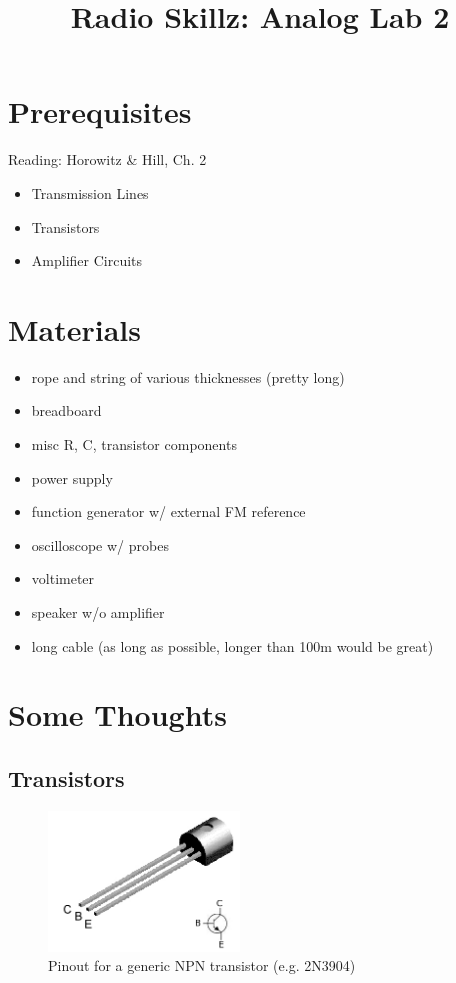 \documentclass[11pt]{article}
\begin{document}
\title{Radio Skillz: Analog Lab 2}

\maketitle

\section*{Prerequisites}

Reading: Horowitz \& Hill, Ch. 2

\begin{itemize}
\item Transmission Lines
\item Transistors
\item Amplifier Circuits
\end{itemize}

\section*{Materials}

\begin{itemize}
\item rope and string of various thicknesses (pretty long)
\item breadboard
\item misc R, C, transistor components
\item power supply
\item function generator w/ external FM reference
\item oscilloscope w/ probes
\item voltimeter
\item speaker w/o amplifier
\item long cable (as long as possible, longer than 100m would be great)
\end{itemize}

\section*{Some Thoughts}

\subsection*{Transistors}

\begin{figure}\centering
\includegraphics[width=2in]{analog_lab_2_plots/npn_transistor_pins.png}
\caption{Pinout for a generic NPN transistor (e.g. 2N3904)}
\label{fig:npn_transistor_pins}
\end{figure}
\end{document}
